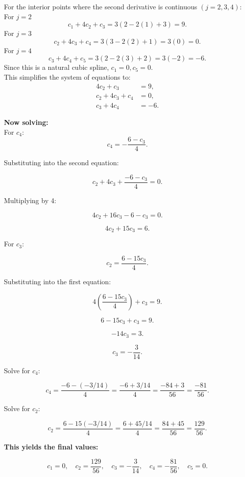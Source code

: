 \documentclass{article}
\begin{document}
For the interior points where the second derivative is continuous $(j=2,3,4)$:
For $j=2$
\[
c_1+4c_2+c_3 = 3(2-2(1)+3)=9.
\]
For $j=3$
\[
c_2+4c_3+c_4=3(3-2(2)+1)=3(0)=0.
\]
For $j=4$
\[
c_3+4c_4+c_5=3(2-2(3)+2)=3(-2)=-6.
\]
Since this is a natural cubic spline, $c_1=0,c_5=0.$\\
This simplifies the system of equations to:
\begin{align*}
4c_2 + c_3 &= 9, \\
c_2 + 4c_3 + c_4 &= 0, \\
c_3 + 4c_4 &= -6.
\end{align*}

\textbf{Now solving:}\\

For \( c_4 \):
\[
c_4 = -\frac{6 - c_3}{4}.
\]

Substituting into the second equation:

\[
c_2 + 4c_3 + \frac{-6 - c_3}{4} = 0.
\]

Multiplying by 4:

\[
4c_2 + 16c_3 - 6 - c_3 = 0.
\]

\[
4c_2 + 15c_3 = 6.
\]

For \( c_3 \):

\[
c_2 = \frac{6 - 15c_3}{4}.
\]

Substituting into the first equation:

\[
4\left(\frac{6 - 15c_3}{4}\right) + c_3 = 9.
\]

\[
6 - 15c_3 + c_3 = 9.
\]

\[
-14c_3 = 3.
\]

\[
c_3 = -\frac{3}{14}.
\]

Solve for \( c_4 \):

\[
c_4 = \frac{-6 - (-3/14)}{4} = \frac{-6 + 3/14}{4} = \frac{-84 + 3}{56} = \frac{-81}{56}.
\]

Solve for \( c_2 \):

\[
c_2 = \frac{6 - 15(-3/14)}{4} = \frac{6 + 45/14}{4} = \frac{84 + 45}{56} = \frac{129}{56}.
\]

\textbf{This yields the final values:}

\[
c_1 = 0, \quad c_2 = \frac{129}{56}, \quad c_3 = -\frac{3}{14}, \quad c_4 = -\frac{81}{56}, \quad c_5 = 0.
\]
\end{document}
